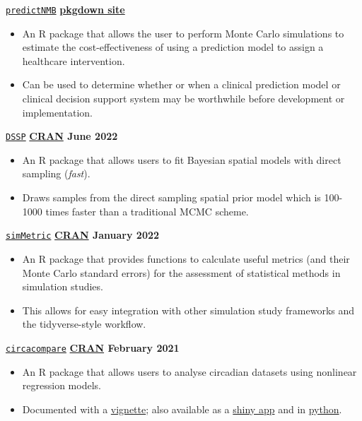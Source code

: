 \texttt{\href{https://github.com/RWParsons/predictNMB}{predictNMB}} \hfill \textbf{\href{https://rwparsons.github.io/predictNMB/}{pkgdown site}} \par
\begin{itemize}
    \item An R package that allows the user to perform Monte Carlo simulations to estimate the cost-effectiveness of using a prediction model to assign a healthcare intervention.
    \item Can be used to determine whether or when a clinical prediction model or clinical decision support system may be worthwhile before development or implementation.
\end{itemize}

\texttt{\href{https://github.com/gentrywhite/DSSP}{DSSP}} \hfill \textbf{\href{https://cran.r-project.org/package=DSSP}{CRAN} June 2022} \par
\begin{itemize}
    \item An R package that allows users to fit Bayesian spatial models with direct sampling (\textit{fast}).
    \item Draws samples from the direct sampling spatial prior model which is 100-1000 times faster than a traditional MCMC scheme.
\end{itemize}

\texttt{\href{https://github.com/RWParsons/simMetric}{simMetric}} \hfill \textbf{\href{https://cran.r-project.org/package=simMetric}{CRAN}  January 2022} \par
\begin{itemize}
    \item An R package that provides functions to calculate useful metrics (and their Monte Carlo standard errors) for the assessment of statistical methods in simulation studies.
    \item This allows for easy integration with other simulation study frameworks and the tidyverse-style workflow.
\end{itemize}

\texttt{\href{https://github.com/RWParsons/circacompare}{circacompare}} \hfill \textbf{\href{https://cran.r-project.org/package=circacompare}{CRAN} February 2021} \par
\begin{itemize}
    \item An R package that allows users to analyse circadian datasets using nonlinear regression models.
    \item Documented with a \href{https://cran.r-project.org/web/packages/circacompare/vignettes/circacompare-vignette.html}{vignette}; also available as a \href{https://rwparsons.shinyapps.io/circacompare/}{shiny app} and in \href{https://github.com/RWParsons/circacompare_py}{python}.
\end{itemize}
